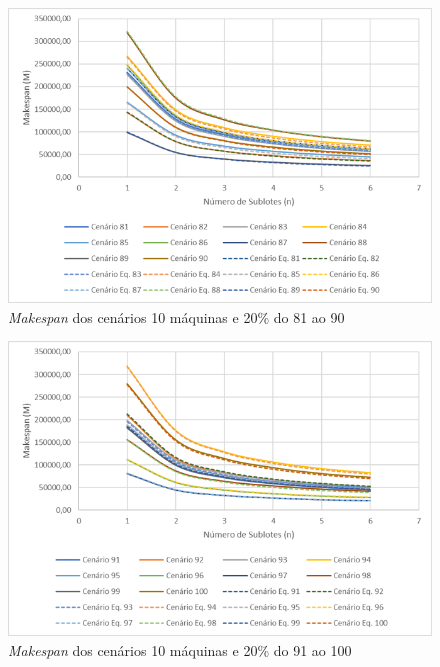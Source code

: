 \begin{figure}[H]
    \centering
     \includegraphics[width=13cm]{Apendices/Figuras/10m20_81-90.png}
     \caption{\textit{Makespan} dos cenários 10 máquinas e 20\% do 81 ao 90}
    \label{fig:10m20_81-90}
\end{figure}

\begin{figure}[H]
    \centering
     \includegraphics[width=13cm]{Apendices/Figuras/10m20_91-100.png}
     \caption{\textit{Makespan} dos cenários 10 máquinas e 20\% do 91 ao 100}
    \label{fig:10m20_91-100}
\end{figure}